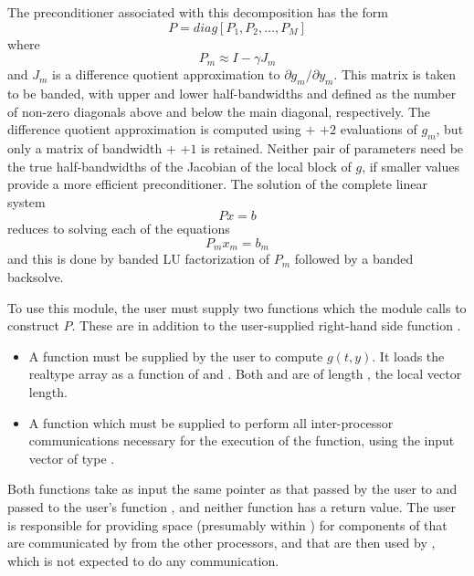 The preconditioner associated with this decomposition has the form 
\begin{equation}
P= diag[P_1, P_2, \ldots, P_M]
\end{equation}
where 
\begin{equation}
P_m \approx I - \gamma J_m
\end{equation}
and $J_m$ is a difference quotient approximation to 
$\partial g_m/\partial y_m$. This matrix is taken to be banded, with
upper and lower half-bandwidths  and  defined as
the number of non-zero diagonals above and below the main diagonal,
respectively. The difference quotient approximation is computed using
 $+$  $+ 2$ evaluations of $g_m$, but only a matrix
of bandwidth  $+$  $+ 1$ is retained. 
Neither pair of parameters need be the true half-bandwidths of the Jacobian of the
local block of $g$, if smaller values provide a more efficient
preconditioner. The solution of the complete linear system
\begin{equation}
Px = b
\end{equation}
reduces to solving each of the equations 
\begin{equation}
P_m x_m = b_m
\end{equation}
and this is done by banded LU factorization of $P_m$ followed by a banded
backsolve.

To use this {\cvbbdpre} module, the user must supply two functions which the
module calls to construct $P$. These are in addition to the user-supplied
right-hand side function .
\begin{itemize}
\item A function  must
  be supplied by the user to compute $g(t,y)$. It loads the realtype array
   as a function of  and .  
  Both  and  are of length , the
  local vector length.
\item  A function  which must be supplied to
  perform all inter-processor communications necessary for the execution of
  the  function, using the input vector  of type 
  .
\end{itemize}
Both functions take as input the same pointer  as that passed
by the user to  and passed to the user's function ,
and neither function has a return value. The user is responsible for
providing space (presumably within ) for components of 
that are communicated by  from the other processors, and that are
then used by , which is not expected to do any communication.

